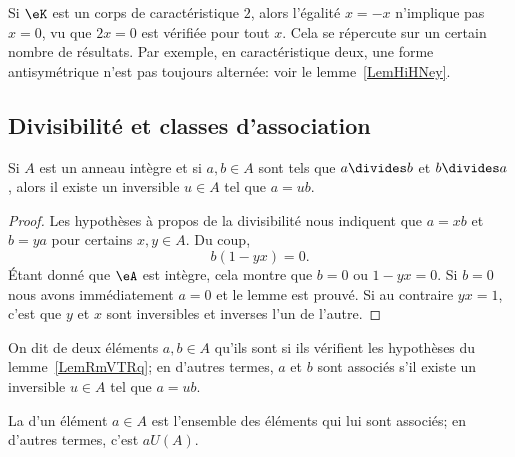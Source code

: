 \begin{example}
    Si \( \eK\) est un corps de caractéristique \( 2\), alors l'égalité \( x=-x\) n'implique pas \( x=0\), vu que \( 2x=0\) est vérifiée pour tout \( x\). Cela se répercute sur un certain nombre de résultats. Par exemple, en caractéristique deux, une forme antisymétrique n'est pas toujours alternée: voir le lemme~\ref{LemHiHNey}.
\end{example}

\subsection{Divisibilité et classes d'association}
\label{DivisibiliteAnneauxIntegres}

\begin{lemma}\label{LemRmVTRq}
    Si \( A\) est un anneau intègre et si \( a,b\in A\) sont tels que \( a\divides b\) et \( b\divides a\), alors il existe un inversible \( u\in A\) tel que \( a=ub\).
\end{lemma}

\begin{proof}
    Les hypothèses à propos de la divisibilité nous indiquent que \( a=xb\) et \( b=ya\) pour certains \( x,y\in A\). Du coup,
    \begin{equation}
        b(1-yx)=0.
    \end{equation}
    Étant donné que \( \eA\) est intègre, cela montre que \( b=0\) ou \( 1-yx=0\). Si \( b=0\) nous avons immédiatement \( a=0\) et le lemme est prouvé. Si au contraire \( yx=1\), c'est que \( y\) et \( x\) sont inversibles et inverses l'un de l'autre.
\end{proof}

\begin{definition}\label{DefrXUixs}
    On dit de deux éléments \( a,b\in A\) qu'ils sont  si ils vérifient les hypothèses du lemme~\ref{LemRmVTRq}; en d'autres termes, $a$ et $b$ sont associés s'il existe un inversible \( u\in A\) tel que \( a=ub\).

    La  d'un élément \( a \in A \) est l'ensemble des éléments qui lui sont associés; en d'autres termes, c'est \( a  U(A) \).
\end{definition}

